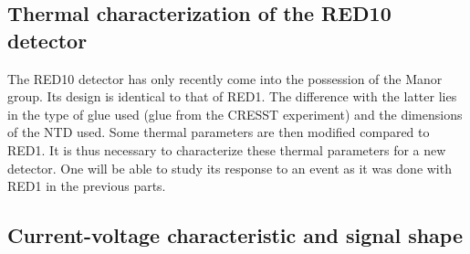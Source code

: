 \subsection{Thermal characterization of the RED10 detector}

The RED10 detector has only recently come into the possession of the Manor group. Its design is identical to that of RED1. The difference with the latter lies in the type of glue used (glue from the CRESST experiment) and the dimensions of the NTD used. Some thermal parameters are then modified compared to RED1. It is thus necessary to characterize these thermal parameters for a new detector. One will be able to study its response to an event as it was done with RED1 in the previous parts.

\subsection{Current-voltage characteristic and signal shape}

